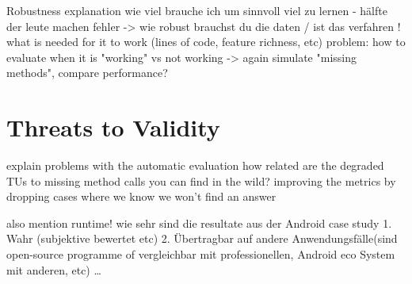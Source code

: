 Robustness explanation
    wie viel brauche ich um sinnvoll viel zu lernen - hälfte der leute machen fehler -> wie robust brauchst du die daten / ist das verfahren !
    what is needed for it to work (lines of code, feature richness, etc) 
    problem: how to evaluate when it is "working" vs not working -> again simulate "missing methods", compare performance?

\section{Threats to Validity}

explain problems with the automatic evaluation
how related are the degraded TUs to missing method calls you can find in the wild?
improving the metrics by dropping cases where we know we won't find an answer

also mention runtime!
wie sehr sind die resultate aus der Android case study 1. Wahr (subjektive bewertet etc) 2. Übertragbar auf andere Anwendungsfälle(sind open-source programme of vergleichbar mit professionellen, Android eco System mit anderen, etc)
\ldots
